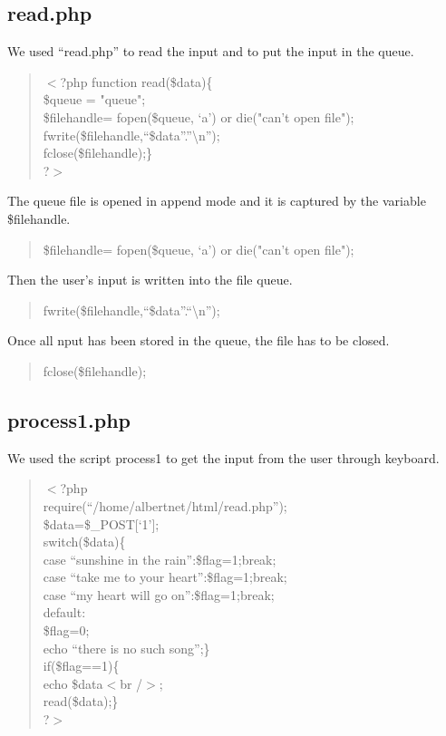 \subsection*{read.php}
We used ``read.php'' to read the input and to put the input in the queue.
\begin{quote}
$<$?php
                function read(\$data)\{ \\
                \$queue = "queue"; \\
                \$filehandle= fopen(\$queue, `a') or die("can't open         file"); \\
                fwrite(\$filehandle,``\$data''.''\textbackslash n''); \\
                fclose(\$filehandle);\} \\
?$>$
\end{quote}
The queue file is opened in append mode and it is captured by the variable \$filehandle. \\
\begin{quote}
\$filehandle= fopen(\$queue, `a') or die("can't open file"); \\
\end{quote}
Then the user's input is written into the file queue. \\
\begin{quote}
fwrite(\$filehandle,``\$data''.``\textbackslash n''); \\
\end{quote}
Once all nput has been stored in the queue, the file has to be closed.
\begin{quote}
fclose(\$filehandle);
\end{quote}



\subsection*{process1.php}
We used the script process1 to get the input from the user through keyboard.
\begin{quote}
$<$?php \\
require(``/home/albertnet/html/read.php''); \\
\$data=\$\_POST[`1']; \\
switch(\$data)\{ \\
        case ``sunshine in the rain'':\$flag=1;break; \\
	case ``take me to your heart'':\$flag=1;break; \\
	case ``my heart will go on'':\$flag=1;break; \\
	default:\\
		\$flag=0;\\
		echo ``there is no such song'';\}\\
if(\$flag==1)\{\\
echo \$data$<$br /$>$;\\
read(\$data);\}\\
?$>$
\end{quote}

